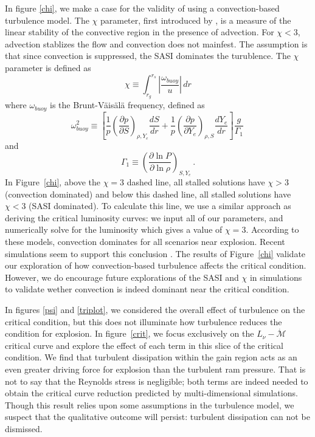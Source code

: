 \documentclass[twocolumn]{aastex6}
\begin{document}
In figure \ref{chi}, we make a case for the validity of using a
convection-based turbulence model. The $\chi$ parameter, first
introduced by \citet{fog06}, is a measure of the linear stability of
the convective region in the presence of advection.  For $\chi < 3$,
advection stablizes the flow and convection does not mainfest.  The
assumption is that since convection is suppressed, the SASI dominates
the turublence.  The $\chi$ parameter is defined as
\begin{equation}
  \chi \equiv \int_{r_g}^{r_s} \left | \frac{\omega_{buoy}}{u} \right
  | \, dr
\end{equation}
where $\omega_{buoy}$ is the Brunt-V\"ais\"al\"a frequency, defined as 
\begin{equation}
  \omega^2_{buoy} \equiv \left [ \frac{1}{p}\left ( \frac{\partial p}{\partial S}\right )_{\rho,Y_e} \frac{dS}{dr} + \frac{1}{p}\left ( \frac{\partial p}{\partial Y_e}\right )_{\rho,S}  \frac{dY_e}{dr} \right ] \frac{g}{\Gamma_1} \,   
\end{equation}
and
\begin{equation}
\Gamma_1 \equiv \left ( \frac{\partial \ln P}{\partial \ln \rho} \right )_{S,Y_e} \, .
\end{equation} 
In Figure~\ref{chi}, above the $\chi = 3$ dashed line, all
stalled solutions have $\chi > 3$
(convection dominated) and below this dashed line, all stalled
solutions have $\chi < 3$ (SASI
dominated).  To calculate this line, we use a similar approach as deriving the critical luminosity curves: we input all
of our parameters, and numerically solve for the luminosity which
gives a value of $\chi = 3$.  According to these
models, convection dominates for all scenarios near explosion.  Recent
simulations seem to support this conclusion
\citep{abdi15,lentz15,couch14,burrows12,iwakami14,ott13,roberts16}. The
results of Figure~\ref{chi} validate our exploration of how
convection-based turbulence affects the critical condition.  However,
we do encourage future explorations of the SASI and $\chi$ in
simulations to validate wether convection is indeed dominant near the
critical condition.

In figures \ref{psi} and \ref{triplot}, we considered the overall
effect of turbulence on the critical condition, but this does
not illuminate how turbulence reduces the condition for explosion. In
figure~\ref{crit}, we focus exclusively on the
$L_\nu-\dot{\mathcal{M}}$ critical curve and explore the
  effect of each term in this slice of the critical condition.  We
find that turbulent dissipation within the gain region acts as an
even greater driving force for explosion than the turbulent ram
pressure. That is not to say that the Reynolds stress is negligible;
both terms are indeed needed to obtain the critical curve reduction
predicted by multi-dimensional simulations. Though this result relies
upon some assumptions in the turbulence model, we suspect that the qualitative outcome
  will persist: turbulent dissipation can not be dismissed.  
\end{document}

